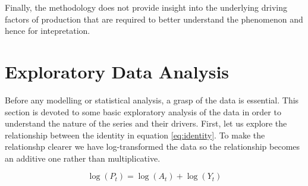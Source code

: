 \documentclass[nojss]{jss}\usepackage{graphicx, color}
\makeatletter
\newenvironment{kframe}{%
 \def\at@end@of@kframe{}%
 \ifinner\ifhmode%
  \def\at@end@of@kframe{\end{minipage}}%
  \begin{minipage}{\columnwidth}%
 \fi\fi%
 \def\FrameCommand##1{\hskip\@totalleftmargin \hskip-\fboxsep
 \colorbox{shadecolor}{##1}\hskip-\fboxsep
     \hskip-\linewidth \hskip-\@totalleftmargin \hskip\columnwidth}%
 \MakeFramed {\advance\hsize-\width
   \@totalleftmargin\z@ \linewidth\hsize
   \@setminipage}}%
 {\par\unskip\endMakeFramed%
 \at@end@of@kframe}
\newenvironment{knitrout}{}{} %
\makeatother
\begin{document}
Finally, the methodology does not provide insight into the
underlying driving factors of production that are required to better understand the phenomenon and hence for
intepretation.



\section{Exploratory Data Analysis}

\begin{knitrout}
\color{fgcolor}\begin{kframe}


{\ttfamily\noindent\bfseries\color{errorcolor}{\#\# Error: cannot open the connection}}

{\ttfamily\noindent\bfseries\color{errorcolor}{\#\# Error: object 'official.dt' not found}}

{\ttfamily\noindent\bfseries\color{errorcolor}{\#\# Error: object 'tmp.dt' not found}}

{\ttfamily\noindent\bfseries\color{errorcolor}{\#\# Error: object 'plot.df' not found}}\end{kframe}
\end{knitrout}


Before any modelling or statistical analysis, a grasp of the data is
essential. This section is devoted to some basic exploratory analysis
of the data in order to understand the nature of the series and their
drivers. First, let us explore the relationship between the identity
in equation \ref{eq:identity}. To make the relationshp clearer we have
log-transformed the data so the relationship becomes an additive one
rather than multiplicative.

\begin{equation}
  \label{eq:logIdentity}
  \log(P_t) = \log(A_t) + \log(Y_t)
\end{equation}


\begin{knitrout}
\color{fgcolor}\begin{kframe}


{\ttfamily\noindent\bfseries\color{errorcolor}{\#\# Error: object 'plot.df' not found}}\end{kframe}
\end{knitrout}



\begin{knitrout}
\color{fgcolor}\begin{kframe}


{\ttfamily\noindent\bfseries\color{errorcolor}{\#\# Error: object 'plot.df' not found}}\end{kframe}
\end{knitrout}
\end{document}
